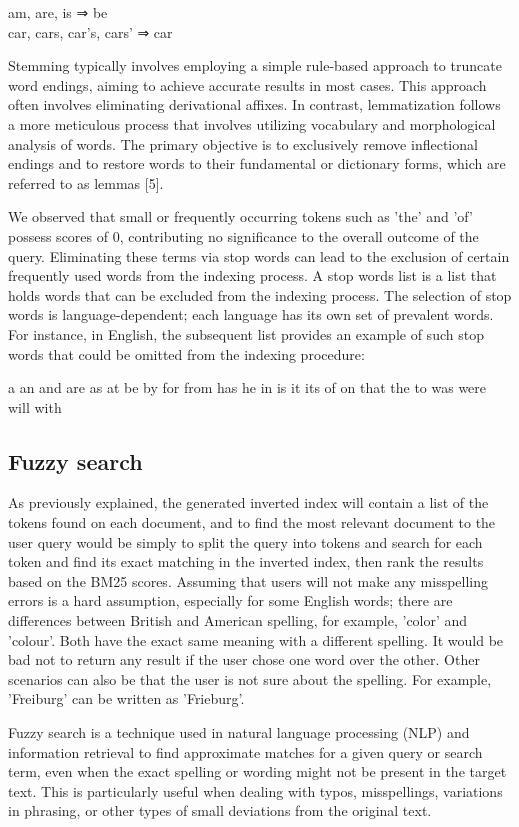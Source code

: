 am, are, is ⇒ be \\
car, cars, car’s, cars’ ⇒ car

Stemming typically involves employing a simple rule-based approach to truncate word endings, aiming to achieve accurate results in most cases. This approach often involves eliminating derivational affixes. In contrast, lemmatization follows a more meticulous process that involves utilizing vocabulary and morphological analysis of words. The primary objective is to exclusively remove inflectional endings and to restore words to their fundamental or dictionary forms, which are referred to as lemmas [5].

We observed that small or frequently occurring tokens such as 'the' and 'of' possess scores of 0, contributing no significance to the overall outcome of the query. Eliminating these terms via stop words can lead to the exclusion of certain frequently used words from the indexing process. A stop words list is a list that holds words that can be excluded from the indexing process. The selection of stop words is language-dependent; each language has its own set of prevalent words. For instance, in English, the subsequent list provides an example of such stop words that could be omitted from the indexing procedure:

a an and are as at be by for from
has he in is it its of on that the
to was were will with


\subsection{Fuzzy search}
As previously explained, the generated inverted index will contain a list of the tokens found on each document, and to find the most relevant document to the user query would be simply to split the query into tokens and search for each token and find its exact matching in the inverted index, then rank the results based on the BM25 scores. Assuming that users will not make any misspelling errors is a hard assumption, especially for some English words; there are differences between British and American spelling, for example, 'color' and 'colour'. Both have the exact same meaning with a different spelling. It would be bad not to return any result if the user chose one word over the other. Other scenarios can also be that the user is not sure about the spelling. For example, 'Freiburg' can be written as 'Frieburg'.  

Fuzzy search is a technique used in natural language processing (NLP) and information retrieval to find approximate matches for a given query or search term, even when the exact spelling or wording might not be present in the target text. This is particularly useful when dealing with typos, misspellings, variations in phrasing, or other types of small deviations from the original text.

